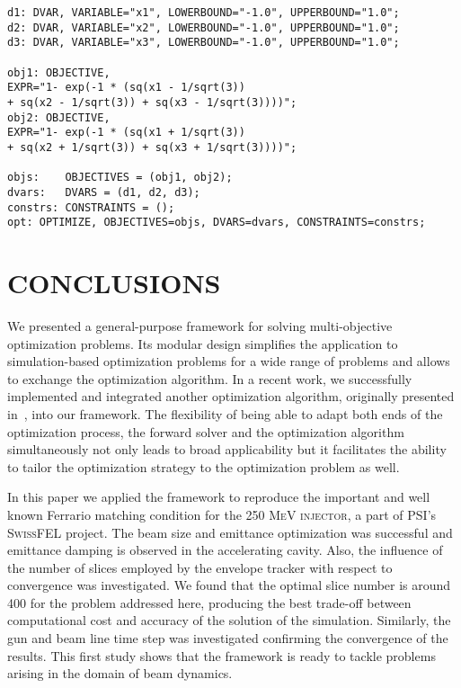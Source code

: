 \documentclass[%
reprint,
amsmath,amssymb,
aps,
]{revtex4-1}
\begin{document}
\vspace{0.2cm}
\begin{flushleft}
\noindent
\begin{Verbatim}[fontsize=\scriptsize]
d1: DVAR, VARIABLE="x1", LOWERBOUND="-1.0", UPPERBOUND="1.0";
d2: DVAR, VARIABLE="x2", LOWERBOUND="-1.0", UPPERBOUND="1.0";
d3: DVAR, VARIABLE="x3", LOWERBOUND="-1.0", UPPERBOUND="1.0";

obj1: OBJECTIVE,
EXPR="1- exp(-1 * (sq(x1 - 1/sqrt(3)) 
+ sq(x2 - 1/sqrt(3)) + sq(x3 - 1/sqrt(3))))";
obj2: OBJECTIVE,
EXPR="1- exp(-1 * (sq(x1 + 1/sqrt(3)) 
+ sq(x2 + 1/sqrt(3)) + sq(x3 + 1/sqrt(3))))";

objs:    OBJECTIVES = (obj1, obj2);
dvars:   DVARS = (d1, d2, d3);
constrs: CONSTRAINTS = ();
opt: OPTIMIZE, OBJECTIVES=objs, DVARS=dvars, CONSTRAINTS=constrs;
\end{Verbatim}
\end{flushleft}

\vspace{0.2cm}






\section{CONCLUSIONS} \label{sec:conclusions}

We presented a general-purpose framework for solving multi-objective
  optimization problems.
Its modular design simplifies the application to simulation-based optimization
  problems for a wide range of problems and allows to exchange the
  optimization algorithm.
In a recent work, we successfully implemented and integrated another
  optimization algorithm, originally presented in~\cite{pesc:11}, into our
  framework.
The flexibility of being able to adapt both ends of the optimization
  process, the forward solver and the optimization algorithm simultaneously
  not only leads to broad applicability but it facilitates the ability to
  tailor the optimization strategy to the optimization problem as well.

In this paper we applied the framework to reproduce the important and well
  known Ferrario matching condition for the \textsc{250 MeV injector}, a part of PSI's
  \textsc{SwissFEL} project.
The beam size and emittance optimization was successful and emittance damping
  is observed in the accelerating cavity.
Also, the influence of the number of slices employed by the envelope tracker
  with respect to convergence was investigated.
We found that the optimal slice number is around 400 for the problem addressed
  here, producing the best trade-off between computational cost and accuracy
  of the solution of the simulation.
Similarly, the gun and beam line time step was investigated confirming the
  convergence of the results.
This first study shows that the framework is ready to tackle problems arising
  in the domain of beam dynamics.
\end{document}
